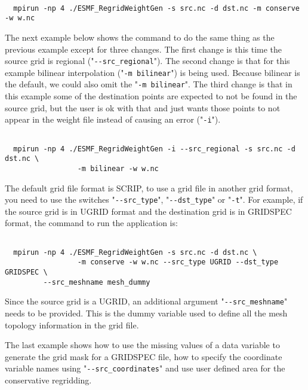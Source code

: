 \begin{verbatim}

  mpirun -np 4 ./ESMF_RegridWeightGen -s src.nc -d dst.nc -m conserve -w w.nc

\end{verbatim}

The next example below shows the command to do the same thing as the previous example except for three changes. The first
change is this time the source grid is regional ("{\tt \verb+--+src\_regional}"). The second change is that
for this example bilinear interpolation ("{\tt -m bilinear}") is being used. Because bilinear is the default, we could also
omit the "{\tt -m bilinear}". The third change is that in this example some of the destination points are expected to
not be found in the source grid, but the user is ok with that and just wants those points to not appear in the weight file instead of causing an error ("{\tt -i}").

\begin{verbatim}

  mpirun -np 4 ./ESMF_RegridWeightGen -i --src_regional -s src.nc -d dst.nc \
                 -m bilinear -w w.nc

\end{verbatim}

The default grid file format is SCRIP, to use a grid file in another grid format, you
need to use the switches "{\tt \verb+--+src\_type}", "{\tt \verb+--+dst\_type}" or "{\tt -t}".  For example, if the
source grid is in UGRID format and the destination grid is in GRIDSPEC format, the command
to run the application is:

\begin{verbatim}

  mpirun -np 4 ./ESMF_RegridWeightGen -s src.nc -d dst.nc \
                 -m conserve -w w.nc --src_type UGRID --dst_type GRIDSPEC \
		 --src_meshname mesh_dummy

\end{verbatim}
 
Since the source grid is a UGRID, an additional argument "{\tt \verb+--+src\_meshname}" needs to be provided.  This is the dummy variable used to define all the mesh topology information in the
grid file.

The last example shows how to use the missing values of a data variable to generate the
grid mask for a GRIDSPEC file, how to specify the coordinate variable names
using "{\tt \verb+--+src\_coordinates}"
 and use user defined area for the conservative regridding.

